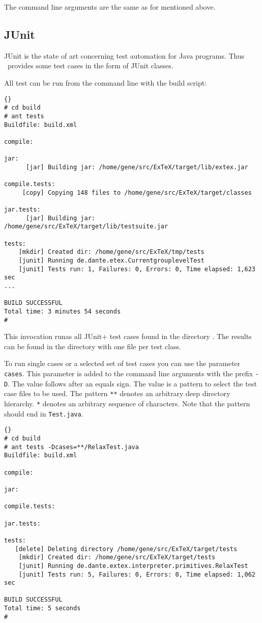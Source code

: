 The command line arguments are the same as for  mentioned
above.


\subsection{JUnit}\label{sec:shell-junit}

JUnit is the state of art concerning test automation for Java
programs. Thus \ExTeX\ provides some test cases in the form of JUnit
classes.

All test can be run from the command line with the build script:

\begin{lstlisting}{}
# cd build
# ant tests
Buildfile: build.xml

compile:

jar:
      [jar] Building jar: /home/gene/src/ExTeX/target/lib/extex.jar

compile.tests:
     [copy] Copying 148 files to /home/gene/src/ExTeX/target/classes

jar.tests:
      [jar] Building jar: /home/gene/src/ExTeX/target/lib/testsuite.jar

tests:
    [mkdir] Created dir: /home/gene/src/ExTeX/tmp/tests
    [junit] Running de.dante.etex.CurrentgrouplevelTest
    [junit] Tests run: 1, Failures: 0, Errors: 0, Time elapsed: 1,623 sec
...

BUILD SUCCESSFUL
Total time: 3 minutes 54 seconds
#
\end{lstlisting}

This invocation runas all \+JUnit+ test cases found in the directory
. The results can be found in the directory
 with one file per test class.

To run single cases or a selected set of test cases you can use the
parameter \texttt{cases}. This parameter is added to the command line
arguments with the prefix \verb|-D|. The value follows after an equals
sign. The value is a pattern to select the test case files to be used.
The pattern \verb|**| denotes an arbitrary deep directory hierarchy.
\verb|*| denotes an arbitrary sequence of characters. Note that the
pattern should end in \verb|Test.java|.

\begin{lstlisting}{}
# cd build
# ant tests -Dcases=**/RelaxTest.java
Buildfile: build.xml

compile:

jar:

compile.tests:

jar.tests:

tests:
   [delete] Deleting directory /home/gene/src/ExTeX/target/tests
    [mkdir] Created dir: /home/gene/src/ExTeX/target/tests
    [junit] Running de.dante.extex.interpreter.primitives.RelaxTest
    [junit] Tests run: 5, Failures: 0, Errors: 0, Time elapsed: 1,062 sec

BUILD SUCCESSFUL
Total time: 5 seconds
#
\end{lstlisting}

